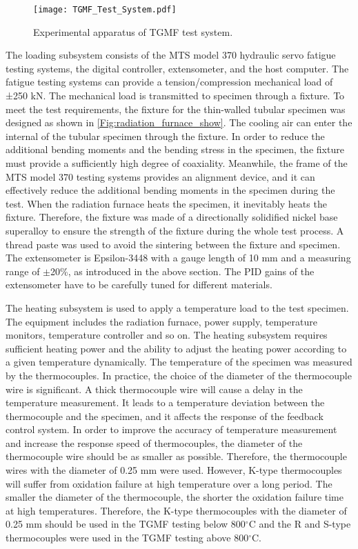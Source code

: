 \begin{figure}[!htp]
	\centering
	\texttt{[image: TGMF\_Test\_System.pdf]}
	\caption{Experimental apparatus of TGMF test system.}
	\label{Fig:TGMF_Test_System}
\end{figure}

The loading subsystem consists of the MTS model 370 hydraulic servo fatigue testing systems, the digital controller, extensometer, and the host computer. The fatigue testing systems can provide a tension/compression mechanical load of ±250 kN. The mechanical load is transmitted to specimen through a fixture. 
To meet the test requirements, the fixture for the thin-walled tubular specimen was designed as shown in \ref{Fig:radiation_furnace_show}.
The cooling air can enter the internal of the tubular specimen through the fixture.
In order to reduce the additional bending moments and the bending stress in the specimen, the fixture must provide a sufficiently high degree of coaxiality. Meanwhile, the frame of the MTS model 370 testing systems provides an alignment device, and it can effectively reduce the additional bending moments in the specimen during the test.
When the radiation furnace heats the specimen, it inevitably heats the fixture. Therefore, the fixture was made of a directionally solidified nickel base superalloy to ensure the strength of the fixture during the whole test process. A thread paste was used to avoid the sintering between the fixture and specimen.
The extensometer is Epsilon-3448 with a gauge length of 10 mm and a measuring range of $\pm$20\%, as introduced in the above section. The PID gains of the extensometer have to be carefully tuned for different materials.

The heating subsystem is used to apply a temperature load to the test specimen. The equipment includes the radiation furnace, power supply, temperature monitors, temperature controller and so on. The heating subsystem requires sufficient heating power and the ability to adjust the heating power according to a given temperature dynamically.
The temperature of the specimen was measured by the thermocouples. In practice, the choice of the diameter of the thermocouple wire is significant. A thick thermocouple wire will cause a delay in the temperature measurement. It leads to a temperature deviation between the thermocouple and the specimen, and it affects the response of the feedback control system. In order to improve the accuracy of temperature measurement and increase the response speed of thermocouples, the diameter of the thermocouple wire should be as smaller as possible. Therefore, the thermocouple wires with the diameter of 0.25 mm were used.
However, K-type thermocouples will suffer from oxidation failure at high temperature over a long period. The smaller the diameter of the thermocouple, the shorter the oxidation failure time at high temperatures. Therefore, the K-type thermocouples with the diameter of 0.25 mm should be used in the TGMF testing below 800$^\circ$C and the R and S-type thermocouples were used in the TGMF testing above 800$^\circ$C.


